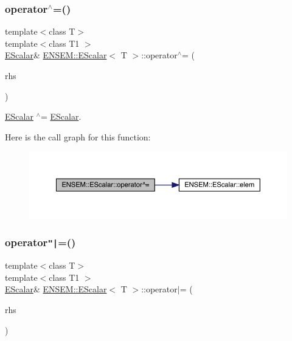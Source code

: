 \subsubsection{\texorpdfstring{operator$^\wedge$=()}{operator^=()}\hspace{0.1cm}{\footnotesize\ttfamily [3/3]}}
{\footnotesize\ttfamily template$<$class T$>$ \\
template$<$class T1 $>$ \\
\mbox{\hyperlink{classENSEM_1_1EScalar}{E\+Scalar}}\& \mbox{\hyperlink{classENSEM_1_1EScalar}{E\+N\+S\+E\+M\+::\+E\+Scalar}}$<$ T $>$\+::operator$^\wedge$= (\begin{DoxyParamCaption}\item[{const \mbox{\hyperlink{classENSEM_1_1EScalar}{E\+Scalar}}$<$ T1 $>$ \&}]{rhs }\end{DoxyParamCaption})\hspace{0.3cm}{\ttfamily [inline]}}



\mbox{\hyperlink{classENSEM_1_1EScalar}{E\+Scalar}} $^\wedge$= \mbox{\hyperlink{classENSEM_1_1EScalar}{E\+Scalar}}. 

Here is the call graph for this function\+:
\nopagebreak
\begin{figure}[H]
\begin{center}
\leavevmode
\includegraphics[width=350pt]{d0/d82/classENSEM_1_1EScalar_a42c2a63d2eda81643ae8145068db3a8e_cgraph}
\end{center}
\end{figure}
\mbox{\label{classENSEM_1_1EScalar_a95469ba3db6456ae2fa0c6d86d082c0a}} 
\subsubsection{\texorpdfstring{operator\texttt{"|}=()}{operator|=()}\hspace{0.1cm}{\footnotesize\ttfamily [1/3]}}
{\footnotesize\ttfamily template$<$class T$>$ \\
template$<$class T1 $>$ \\
\mbox{\hyperlink{classENSEM_1_1EScalar}{E\+Scalar}}\& \mbox{\hyperlink{classENSEM_1_1EScalar}{E\+N\+S\+E\+M\+::\+E\+Scalar}}$<$ T $>$\+::operator$\vert$= (\begin{DoxyParamCaption}\item[{const \mbox{\hyperlink{classENSEM_1_1EScalar}{E\+Scalar}}$<$ T1 $>$ \&}]{rhs }\end{DoxyParamCaption})\hspace{0.3cm}{\ttfamily [inline]}}



